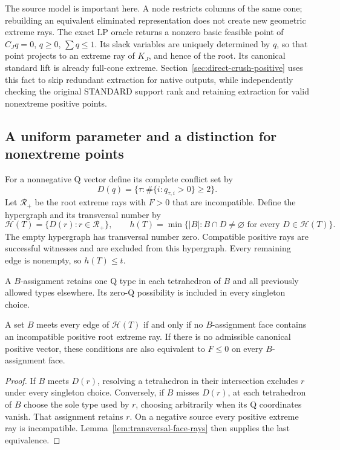 The source model is important here.  A node restricts columns of the same
cone; rebuilding an equivalent eliminated representation does not create
new geometric extreme rays.  The exact LP oracle returns a nonzero basic
feasible point of $C_Jq=0$, $q\ge0$, $\sum q\le1$.  Its slack variables
are uniquely determined by $q$, so that point projects to an extreme ray
of $K_J$, and hence of the root.  Its canonical standard lift is already
full-cone extreme.  Section~\ref{sec:direct-crush-positive} uses this fact
to skip redundant extraction for native outputs, while independently
checking the original STANDARD support rank and retaining extraction
for valid nonextreme positive points.

\subsection{A uniform parameter and a distinction for nonextreme points}

For a nonnegative Q vector define its complete conflict set by
\[
 D(q)=\{\tau:\#\{i:q_{\tau,i}>0\}\ge2\}.
\]
Let $\mathcal R_+$ be the root extreme rays with $F>0$ that are
incompatible.  Define the hypergraph and its transversal number by
\[
 \mathcal H(T)=\{D(r):r\in\mathcal R_+\},\qquad
 h(T)=\min\{|B|:B\cap D\ne\varnothing
                       \text{ for every }D\in\mathcal H(T)\}.
\]
The empty hypergraph has transversal number zero.  Compatible positive
rays are successful witnesses and are excluded from this hypergraph.
Every remaining edge is nonempty, so $h(T)\le t$.

A $B$-assignment retains one Q type in each tetrahedron of $B$ and all
previously allowed types elsewhere.  Its zero-Q possibility is included
in every singleton choice.

\begin{proposition}
\label{prop:uniform-q-transversal}
A set $B$ meets every edge of $\mathcal H(T)$ if and only if no
$B$-assignment face contains an incompatible positive root extreme ray.
If there is no admissible canonical positive vector, these conditions
are also equivalent to $F\le0$ on every $B$-assignment face.
\end{proposition}
\begin{proof}
If $B$ meets $D(r)$, resolving a tetrahedron in their intersection
excludes $r$ under every singleton choice.  Conversely, if $B$ misses
$D(r)$, at each tetrahedron of $B$ choose the sole type used by $r$,
choosing arbitrarily when its Q coordinates vanish.  That assignment
retains $r$.  On a negative source every positive extreme ray is
incompatible.  Lemma~\ref{lem:transversal-face-rays} then supplies the
last equivalence.
\end{proof}

